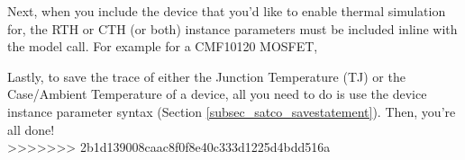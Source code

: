 
Next, when you include the device that you'd like to enable thermal simulation for, the RTH or CTH (or both) instance parameters must be included
inline with the model call. For example for a CMF10120 MOSFET,


Lastly, to save the trace of either the Junction Temperature (TJ) or the Case/Ambient Temperature of a device, all you need to do is use the
device instance parameter syntax (Section \ref{subsec_satco_savestatement}). Then, you're all done! \\


>>>>>>> 2b1d139008caac8f0f8e40c333d1225d4bdd516a






